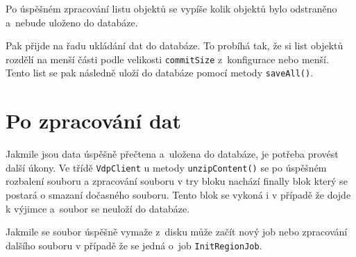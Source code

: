 
Po úspěšném zpracování listu objektů se vypíše kolik objektů bylo odstraněno a~nebude uloženo do databáze.

Pak přijde na řadu ukládání dat do databáze.
To probíhá tak, že si list objektů rozdělí na menší části podle velikosti \texttt{commitSize} z~konfigurace nebo menší.
Tento list se pak následně uloží do databáze pomocí metody \texttt{saveAll()}.

\newpage

\section{Po zpracování dat}
Jakmile jsou data úspěšně přečtena a~uložena do databáze, je potřeba provést další úkony.
Ve třídě \texttt{VdpClient} u metody \texttt{unzipContent()} se po úspěšném rozbalení souboru 
a zpracování souboru v try bloku nachází finally blok který se postará o smazaní dočasného souboru.
Tento blok se vykoná i v případě že dojde k výjimce a~soubor se neuloží do databáze.

Jakmile se soubor úspěšně vymaže z~disku může začít nový job nebo zpracování dalšího souboru
v případě že se jedná o~job \texttt{InitRegionJob}.